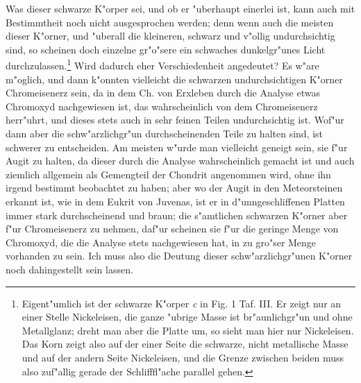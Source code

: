 \documentclass[a4paper, 11pt, oneside, german]{article}
\begin{document}
Was dieser schwarze K"orper sei, und ob er "uberhaupt einerlei ist, kann auch mit Bestimmtheit noch nicht ausgesprochen werden; denn wenn auch die meisten dieser K"orner, und "uberall die kleineren, schwarz und v"ollig undurchsichtig sind, so scheinen doch einzelne gr"o"sere ein schwaches dunkelgr"unes Licht durchzulassen.\footnote{Eigent"umlich ist der schwarze K"orper \emph{c} in Fig. 1 Taf. III. Er zeigt nur an einer Stelle Nickeleisen, die ganze "ubrige Masse ist br"aunlichgr"un und ohne Metallglanz; dreht man aber die Platte um, so sieht man hier nur Nickeleisen. Das Korn zeigt also auf der einer Seite die schwarze, nicht metallische Masse und auf der andern Seite Nickeleisen, und die Grenze zwischen beiden muss also zuf"allig gerade der Schlifffl"ache parallel gehen.} Wird dadurch eher Verschiedenheit angedeutet? Es w"are m"oglich, und dann k"onnten vielleicht die schwarzen undurchsichtigen K"orner Chromeisenerz sein, da in dem Ch. von Erxleben durch die Analyse etwas Chromoxyd nachgewiesen ist, das wahrscheinlich von dem Chromeisenerz herr"uhrt, und dieses stets auch in sehr feinen Teilen undurchsichtig ist. Wof"ur dann aber die schw"arzlichgr"un durchscheinenden Teile zu halten sind, ist schwerer zu entscheiden. Am meisten w"urde man vielleicht geneigt sein, sie f"ur Augit zu halten, da dieser durch die Analyse wahrscheinlich gemacht ist und auch ziemlich allgemein als Gemengteil der Chondrit angenommen wird, ohne ihn irgend bestimmt beobachtet zu haben; aber wo der Augit in den Meteorsteinen erkannt ist, wie in dem Eukrit von Juvenas, ist er in d"unngeschliffenen Platten immer stark durchscheinend und braun; die s"amtlichen schwarzen K"orner aber f"ur Chromeisenerz zu nehmen, daf"ur scheinen sie f"ur die geringe Menge von Chromoxyd, die die Analyse stets nachgewiesen hat, in zu gro"ser Menge vorhanden zu sein. Ich muss also die Deutung dieser schw"arzlichgr"unen K"orner noch dahingestellt sein lassen.
\end{document}
